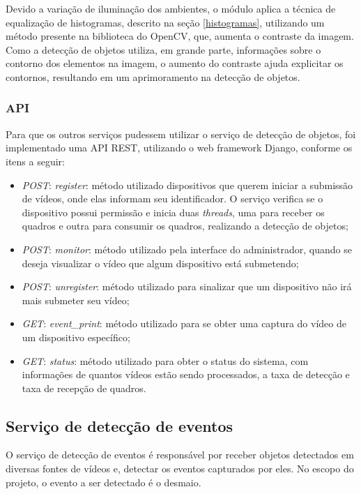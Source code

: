 \documentclass[]{politex}
\begin{document}
Devido a variação de iluminação dos ambientes, o módulo aplica a técnica de equalização de histogramas, descrito na seção \ref{histogramas}, utilizando um método presente na biblioteca do OpenCV, que, aumenta o contraste da imagem. Como a detecção de objetos utiliza, em grande parte, informações sobre o contorno dos elementos na imagem, o aumento do contraste ajuda explicitar os contornos, resultando em um aprimoramento na detecção de objetos.

\subsubsection{API}
Para que os outros serviços pudessem utilizar o serviço de detecção de objetos, foi implementado uma API REST, utilizando o web framework Django, conforme os itens a seguir:
\begin{itemize}
    \item \textit{POST}: \textit{register}: método utilizado dispositivos que querem iniciar a submissão de vídeos, onde elas informam seu identificador. O serviço verifica se o dispositivo possui permissão e inicia duas \textit{threads}, uma para receber os quadros e outra para consumir os quadros, realizando a detecção de objetos;
    \item \textit{POST}: \textit{monitor}: método utilizado pela interface do administrador, quando se deseja visualizar o vídeo que algum dispositivo está submetendo;
    \item \textit{POST}: \textit{unregister}: método utilizado para sinalizar que um dispositivo não irá mais submeter seu vídeo;
    \item \textit{GET}: \textit{event\_print}: método utilizado para se obter uma captura do vídeo de um dispositivo específico;
    \item \textit{GET}: \textit{status}: método utilizado para obter o status do sistema, com informações de quantos vídeos estão sendo processados, a taxa de detecção e taxa de recepção de quadros.
\end{itemize}

\subsection{Serviço de detecção de eventos}
O serviço de detecção de eventos é responsável por receber objetos detectados em diversas fontes de vídeos e, detectar os eventos capturados por eles. No escopo do projeto, o evento a ser detectado é o desmaio.
\end{document}
